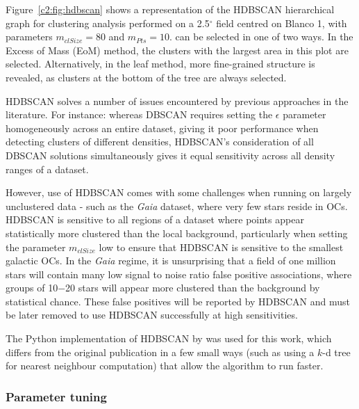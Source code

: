 Figure~\ref{c2:fig:hdbscan} shows a representation of the HDBSCAN hierarchical graph for clustering analysis performed on a 2.5$^\circ$ field centred on Blanco 1, with parameters $m_{clSize}=80$ and $m_{Pts}=10$. can be selected in one of two ways. In the Excess of Mass (EoM) method, the clusters with the largest area in this plot are selected. Alternatively, in the leaf method, more fine-grained structure is revealed, as clusters at the bottom of the tree are always selected. 

HDBSCAN solves a number of issues encountered by previous approaches in the literature. For instance: whereas DBSCAN requires setting the $\epsilon$ parameter homogeneously across an entire dataset, giving it poor performance when detecting clusters of different densities, HDBSCAN's consideration of all DBSCAN solutions simultaneously gives it equal sensitivity across all density ranges of a dataset. 

However, use of HDBSCAN comes with some challenges when running on largely unclustered data - such as the \emph{Gaia} dataset, where very few stars reside in OCs. HDBSCAN is sensitive to all regions of a dataset where points appear statistically more clustered than the local background, particularly when setting the parameter $m_{clSize}$ low to ensure that HDBSCAN is sensitive to the smallest galactic OCs. In the \emph{Gaia} regime, it is unsurprising that a field of one million stars will contain many low signal to noise ratio false positive associations, where groups of 10$-$20 stars will appear more clustered than the background by statistical chance. These false positives will be reported by HDBSCAN and must be later removed to use HDBSCAN successfully at high sensitivities.

The Python implementation of HDBSCAN by \cite{mcinnes_hdbscan_2017} was used for this work, which differs from the original publication in a few small ways (such as using a $k$-d tree for nearest neighbour computation) that allow the algorithm to run faster. 

\subsubsection{Parameter tuning}

